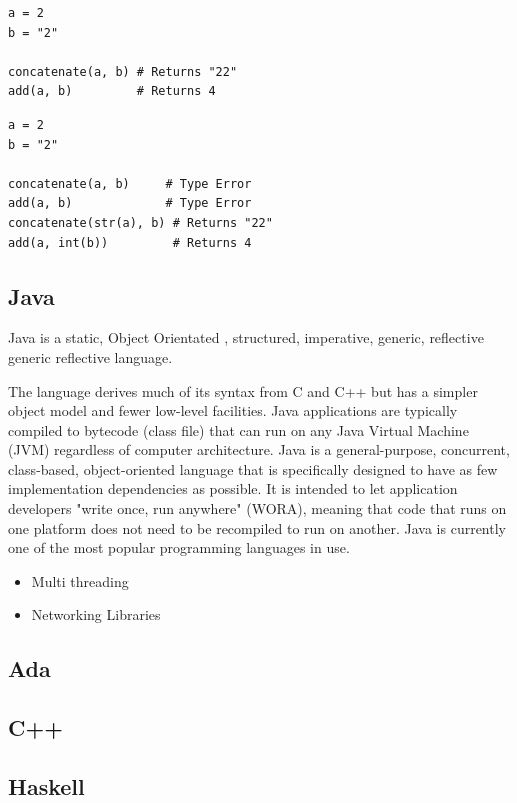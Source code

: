 \documentclass[a4paper,oneside]{report}
\begin{document}
\begin{lstlisting}[label=some-code,caption=Weak Typing] 
a = 2
b = "2"
 
concatenate(a, b) # Returns "22"
add(a, b)         # Returns 4
\end{lstlisting}

\begin{lstlisting}[label=some-code,caption=Strong Typing] 
a = 2
b = "2"
 
concatenate(a, b)     # Type Error
add(a, b)             # Type Error
concatenate(str(a), b) # Returns "22"
add(a, int(b))         # Returns 4
\end{lstlisting}

	\subsection{Java}
	
	Java is a static, Object Orientated , structured, imperative, generic, reflective generic reflective language. 
	
	The language derives much of its syntax from C and C++ but has a simpler object model and fewer low-level facilities. Java applications are typically compiled to bytecode (class file) that can run on any Java Virtual Machine (JVM) regardless of computer architecture. Java is a general-purpose, concurrent, class-based, object-oriented language that is specifically designed to have as few implementation dependencies as possible. It is intended to let application developers "write once, run anywhere" (WORA), meaning that code that runs on one platform does not need to be recompiled to run on another. Java is currently one of the most popular programming languages in use.
	
	
	\begin{itemize}
	\item Multi threading
	\item Networking Libraries
	\
	\end{itemize}
	

	\subsection{Ada}


	\subsection{C++}


	\subsection{Haskell}
\end{document}
